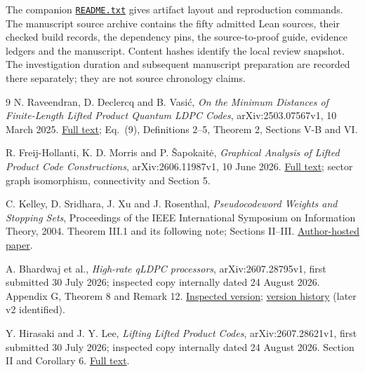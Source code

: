 \documentclass[11pt]{article}
\theoremstyle{definition}\newtheorem{definition}[theorem]{Definition}
\begin{document}
The companion \href{README.txt}{\texttt{README.txt}} gives artifact
layout and reproduction commands. The manuscript source archive
contains the fifty admitted Lean sources, their checked build records,
the dependency pins, the source-to-proof guide, evidence ledgers and
the manuscript. Content hashes identify the local review snapshot.
The investigation duration and subsequent manuscript preparation are
recorded there separately; they are not source chronology claims.

\begin{thebibliography}{9}
N. Raveendran, D. Declercq and B. Vasi\'c,
\emph{On the Minimum Distances of Finite-Length Lifted Product Quantum
LDPC Codes}, arXiv:2503.07567v1, 10 March 2025.
\href{https://arxiv.org/html/2503.07567v1}{Full text};
Eq.~(9), Definitions 2--5, Theorem 2, Sections V-B and VI.

R. Freij-Hollanti, K. D. Morris and P. \v Sapokait\.{e},
\emph{Graphical Analysis of Lifted Product Code Constructions},
arXiv:2606.11987v1, 10 June 2026.
\href{https://arxiv.org/html/2606.11987v1}{Full text};
sector graph isomorphism, connectivity and Section 5.

C. Kelley, D. Sridhara, J. Xu and J. Rosenthal,
\emph{Pseudocodeword Weights and Stopping Sets},
Proceedings of the IEEE International Symposium on Information Theory,
2004. Theorem III.1 and its following note; Sections II--III.
\href{https://user.math.uzh.ch/kelley/isit2004_Chicago.pdf}{Author-hosted paper}.

A. Bhardwaj et al., \emph{High-rate qLDPC processors},
arXiv:2607.28795v1, first submitted 30 July 2026; inspected copy
internally dated 24 August 2026. Appendix G, Theorem 8 and Remark 12.
\href{https://arxiv.org/html/2607.28795v1}{Inspected version};
\href{https://arxiv.org/abs/2607.28795}{version history} (later v2 identified).

Y. Hirasaki and J. Y. Lee, \emph{Lifting Lifted Product Codes},
arXiv:2607.28621v1, first submitted 30 July 2026; inspected copy
internally dated 24 August 2026. Section II and Corollary 6.
\href{https://arxiv.org/html/2607.28621v1}{Full text}.
\end{thebibliography}
\end{document}
